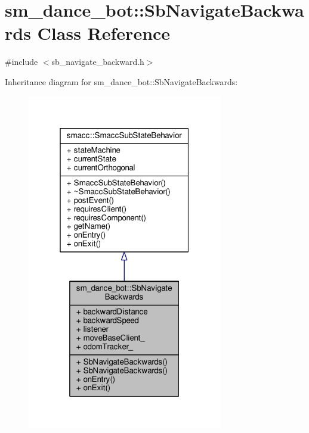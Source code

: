 \hypertarget{classsm__dance__bot_1_1SbNavigateBackwards}{}\section{sm\+\_\+dance\+\_\+bot\+:\+:Sb\+Navigate\+Backwards Class Reference}
\label{classsm__dance__bot_1_1SbNavigateBackwards}


{\ttfamily \#include $<$sb\+\_\+navigate\+\_\+backward.\+h$>$}



Inheritance diagram for sm\+\_\+dance\+\_\+bot\+:\+:Sb\+Navigate\+Backwards\+:
\nopagebreak
\begin{figure}[H]
\begin{center}
\leavevmode
\includegraphics[width=241pt]{classsm__dance__bot_1_1SbNavigateBackwards__inherit__graph}
\end{center}
\end{figure}


